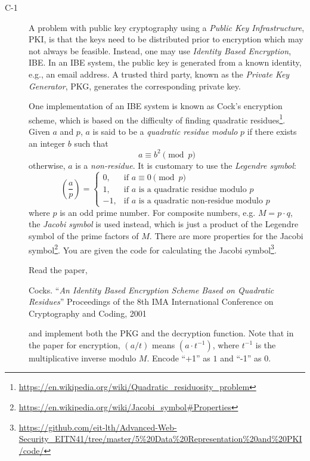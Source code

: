 \documentclass{article}
\begin{document}
		\begin{description}
			\item[C-1]{A problem with public key cryptography using a \emph{Public Key Infrastructure}, PKI, is that
				the keys need to be distributed prior to encryption which may not always be feasible.
				Instead, one may use \emph{Identity Based Encryption}, IBE. In an IBE system, the public key is generated
				from a known identity, e.g., an email address. A trusted third party, known as the \emph{Private Key Generator}, PKG,
				generates the corresponding private key.
				
				One implementation of an IBE system is known as Cock's encryption scheme,
				which is based on the difficulty of finding quadratic 
				residues\footnote{\url{https://en.wikipedia.org/wiki/Quadratic_residuosity_problem}}.
				Given $a$ and $p$, $a$ is said to be a \emph{quadratic residue modulo} $p$ if there exists an integer $b$
				such that
				\[
				a \equiv b^2 \pmod p
				\]
				otherwise, $a$ is a \emph{non-residue}.
				It is customary to use the \emph{Legendre symbol}:
				\[
				\left(\frac{a}{p}\right) = 
				\begin{cases}
				0, & \text{if $a \equiv 0 \pmod p$}\\
				1, & \text{if $a$ is a quadratic residue modulo $p$}\\
				-1, & \text{if $a$ is a quadratic non-residue modulo $p$}
				\end{cases}
				\]
				where $p$ is an odd prime number. For composite numbers, e.g. $M = p \cdot q$, the \emph{Jacobi symbol} is used
				instead, which is just a product of the Legendre symbol of the prime factors of $M$.
				There are more properties for the Jacobi symbol\footnote{\url{https://en.wikipedia.org/wiki/Jacobi_symbol#Properties}}. You are given the code
				for calculating the Jacobi symbol\footnote{\url{https://github.com/eit-lth/Advanced-Web-Security_EITN41/tree/master/5\%20Data\%20Representation\%20and\%20PKI/code/}}. 
				
				Read the paper,
				\begin{center}
					\begin{minipage}{0.8\textwidth}
						Cocks. ``\emph{An Identity Based Encryption Scheme Based on Quadratic Residues}'' 
						Proceedings of the 8th IMA International Conference on Cryptography and Coding, 2001
					\end{minipage}
				\end{center}
				and implement both the PKG and the decryption function. Note that in the paper for encryption, 
				$(a / t)$ means $(a \cdot t^{-1})$, where $t^{-1}$ is the multiplicative inverse modulo $M$.
				Encode ``+1'' as $1$ and ``-1'' as $0$.
				
}
\end{description}
\end{document}
